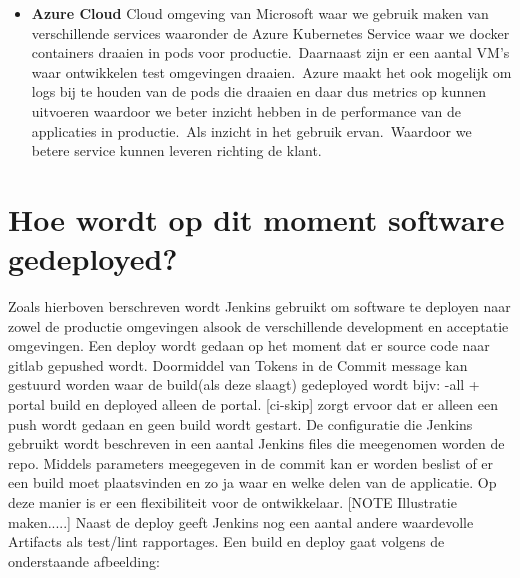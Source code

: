 \begin{itemize}
\item \textbf{Azure Cloud}
Cloud omgeving van Microsoft waar we gebruik maken van verschillende services waaronder de Azure Kubernetes Service waar we docker containers draaien in pods voor productie.\ Daarnaast zijn er een aantal VM's waar ontwikkelen test omgevingen draaien.\ Azure maakt het ook mogelijk om logs bij te houden van de pods die draaien en daar dus metrics op kunnen uitvoeren waardoor we beter inzicht hebben in de performance van de applicaties in productie.\ Als inzicht in het gebruik ervan.\ Waardoor we betere service kunnen leveren richting de klant.
\end{itemize}

\section{Hoe wordt op dit moment software gedeployed?}\label{sec:hoe-wordt-op-dit-moment-software-gedeployed?}
Zoals hierboven berschreven wordt Jenkins gebruikt om software te deployen naar zowel de productie omgevingen alsook de verschillende development en acceptatie omgevingen.
Een deploy wordt gedaan op het moment dat er source code naar gitlab gepushed wordt.
Doormiddel van Tokens in de Commit message kan gestuurd worden waar de build(als deze slaagt) gedeployed wordt bijv: {-all + portal} build en deployed alleen de portal. [ci-skip] zorgt ervoor dat er alleen een push wordt gedaan en geen build wordt gestart.
De configuratie die Jenkins gebruikt wordt beschreven in een aantal Jenkins files die meegenomen worden de repo. Middels parameters meegegeven in de commit kan er worden beslist of er een build moet plaatsvinden en zo ja waar en welke delen van de applicatie. Op deze manier is er een flexibiliteit voor de ontwikkelaar.
[NOTE Illustratie maken.....]
Naast de deploy geeft Jenkins nog een aantal andere waardevolle Artifacts als test/lint rapportages.
Een build en deploy gaat volgens de onderstaande afbeelding:

